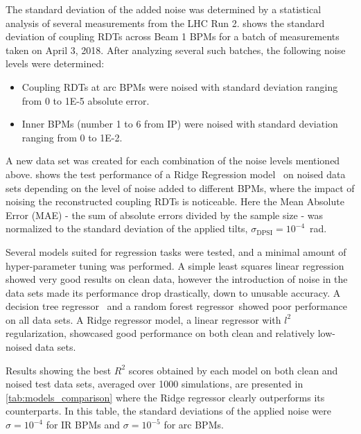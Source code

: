 The standard deviation of the added noise was determined by a statistical analysis of several measurements from the LHC Run 2.
 shows the standard deviation of coupling RDTs across Beam 1 BPMs for a batch of measurements taken on April 3, 2018.
After analyzing several such batches, the following noise levels were determined:

\begin{itemize}
    \item Coupling RDTs at arc BPMs were noised with standard deviation ranging from \num{0} to \num{1E-5} absolute error.
    \item Inner BPMs (number \num{1} to \num{6} from IP) were noised with standard deviation ranging from \num{0} to \num{1E-2}.
\end{itemize}

A new data set was created for each combination of the noise levels mentioned above.
 shows the test performance of a Ridge Regression model~\cite{rifkinNotesRegularizedLeastSquares2007} on noised data sets depending on the level of noise added to different BPMs, where the impact of noising the reconstructed coupling RDTs is noticeable.
Here the Mean Absolute Error (MAE) - the sum of absolute errors divided by the sample size - was normalized to the standard deviation of the applied tilts, \(\sigma_{\mathrm{DPSI}} = 10^{-4}\)~\unit{\radian}.

Several models suited for regression tasks were tested, and a minimal amount of hyper-parameter tuning was performed.
A simple least squares linear regression~\cite{Lai1977LeastSquaresReg} showed very good results on clean data, however the introduction of noise in the data sets made its performance drop drastically, down to unusable accuracy.
A decision tree regressor~\cite{Breiman2017DecisionTrees} and a random forest regressor~\cite{Breiman2001RandomForest}showed poor performance on all data sets.
A Ridge regressor model, a linear regressor with \(\mathit{l}^2\) regularization, showcased good performance on both clean and relatively low-noised data sets.

Results showing the best \(R^{2}\) scores obtained by each model on both clean and noised test data sets, averaged over \num{1000} simulations, are presented in \cref{tab:models_comparison} where the Ridge regressor clearly outperforms its counterparts.
In this table, the standard deviations of the applied noise were \(\sigma = 10^{-4}\) for IR BPMs and  \(\sigma = 10^{-5}\) for arc BPMs.

